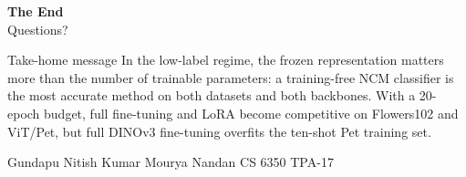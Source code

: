 \documentclass[10pt, aspectratio=169]{beamer}
\begin{document}
\begin{frame}[plain]
  \centering
  \vspace{1.3cm}
  {\Huge\bfseries The End}\\[0.35cm]
  {\Large Questions?}\\[0.9cm]
  \begin{minipage}{0.88\textwidth}
    \begin{block}{Take-home message}
      \centering
      In the low-label regime, the frozen representation matters more than the number of trainable parameters: a training-free NCM classifier is the most accurate method on both datasets and both backbones. With a 20-epoch budget, full fine-tuning and LoRA become competitive on Flowers102 and ViT/Pet, but full DINOv3 fine-tuning overfits the ten-shot Pet training set.
    \end{block}
  \end{minipage}
  \vfill
  {\footnotesize Gundapu Nitish Kumar \quad\textbar\quad Mourya Nandan \quad\textbar\quad CS 6350 TPA-17}
\end{frame}
\end{document}
